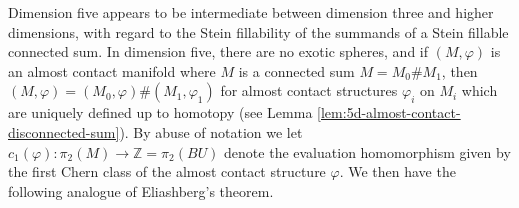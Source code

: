 \documentclass[12pt]{amsart}
\newcommand\Z{\mathbb{Z}}
\newcommand\acs{\varphi}  				%
\theoremstyle{remark}
\begin{document}

Dimension five appears to be 
intermediate between dimension three and higher dimensions,
with regard to the Stein fillability of the summands of a Stein fillable
connected sum.
In dimension five, there are no exotic spheres, and 
if $(M, \acs)$ is an almost contact manifold where $M$ is a connected sum
$M = M_0 \# M_1$, then $(M, \acs) = (M_0, \acs) \# (M_1, \acs_1)$ for almost
contact structures $\acs_i$ on $M_i$ which are uniquely defined up to homotopy
(see Lemma \ref{lem:5d-almost-contact-disconnected-sum}).
By abuse of notation we let
$c_1(\varphi) \colon \pi_2(M) \to \Z = \pi_2(BU)$ denote the evaluation homomorphism given by the first Chern class of the almost contact structure $\varphi$. We then have the following
analogue of Eliashberg's theorem.
\end{document}
